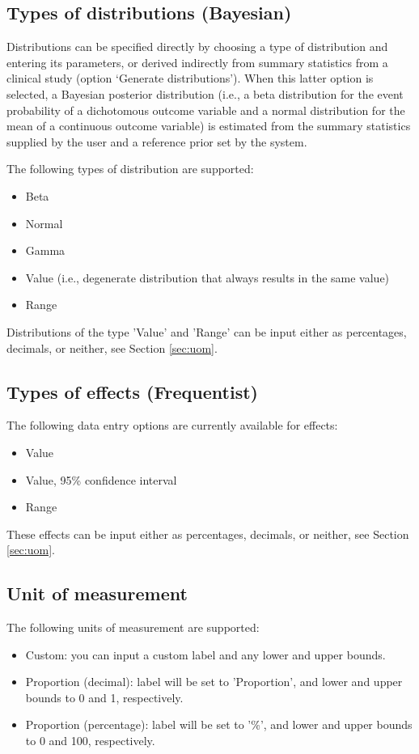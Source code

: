\documentclass[00_mcda_tutorial.tex]{subfiles}
\begin{document}
\subsection*{Types of distributions (Bayesian)}
Distributions can be specified directly by choosing a type of distribution and entering its parameters, or derived indirectly from summary statistics from a clinical study (option ‘Generate distributions’). When this latter option is selected, a Bayesian posterior distribution (i.e., a beta distribution for the event probability of a dichotomous outcome variable and a normal distribution for the mean of a continuous outcome variable) is estimated from the summary statistics supplied by the user and a reference prior set by the system.
\newline

\noindent The following types of distribution are supported:
\begin{itemize}
\item Beta
\item Normal
\item Gamma
\item Value (i.e., degenerate distribution that always results in the same value)
\item Range
\end{itemize}

\noindent Distributions of the type 'Value' and 'Range' can be input either as percentages, decimals, or neither, see Section \ref{sec:uom}.
    
\subsection*{Types of effects (Frequentist)}
The following data entry options are currently available for effects:
\begin{itemize}
\item Value
\item Value, 95\% confidence interval
\item Range
\end{itemize}

\noindent These effects can be input either as percentages, decimals, or neither, see Section \ref{sec:uom}.
 
\subsection*{Unit of measurement}
\label{sec:uom}
The following units of measurement are supported:
\begin{itemize}
\item Custom: you can input a custom label and any lower and upper bounds.
\item Proportion (decimal): label will be set to 'Proportion', and lower and upper bounds to 0 and 1, respectively.
\item Proportion (percentage): label will be set to '\%', and lower and upper bounds to 0 and 100, respectively.
\end{itemize}
\end{document}
